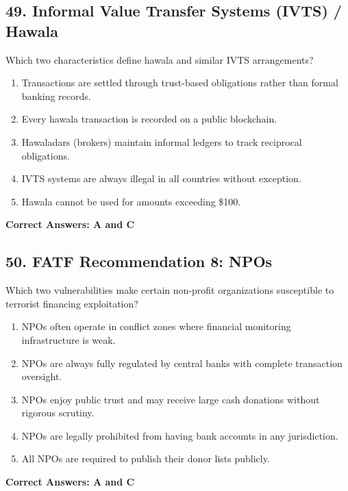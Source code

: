 \documentclass[11pt,a4paper]{article}
\begin{document}
	\subsection{49. Informal Value Transfer Systems (IVTS) / Hawala}
	Which two characteristics define hawala and similar IVTS arrangements?
	\begin{enumerate}[label=\Alph*.]
		\item Transactions are settled through trust-based obligations rather than formal banking records.
		\item Every hawala transaction is recorded on a public blockchain.
		\item Hawaladars (brokers) maintain informal ledgers to track reciprocal obligations.
		\item IVTS systems are always illegal in all countries without exception.
		\item Hawala cannot be used for amounts exceeding \$100.
	\end{enumerate}
	\textbf{Correct Answers: A and C}
	
	\subsection{50. FATF Recommendation 8: NPOs}
	Which two vulnerabilities make certain non-profit organizations susceptible to terrorist financing exploitation?
	\begin{enumerate}[label=\Alph*.]
		\item NPOs often operate in conflict zones where financial monitoring infrastructure is weak.
		\item NPOs are always fully regulated by central banks with complete transaction oversight.
		\item NPOs enjoy public trust and may receive large cash donations without rigorous scrutiny.
		\item NPOs are legally prohibited from having bank accounts in any jurisdiction.
		\item All NPOs are required to publish their donor lists publicly.
	\end{enumerate}
	\textbf{Correct Answers: A and C}
	
\end{document}
